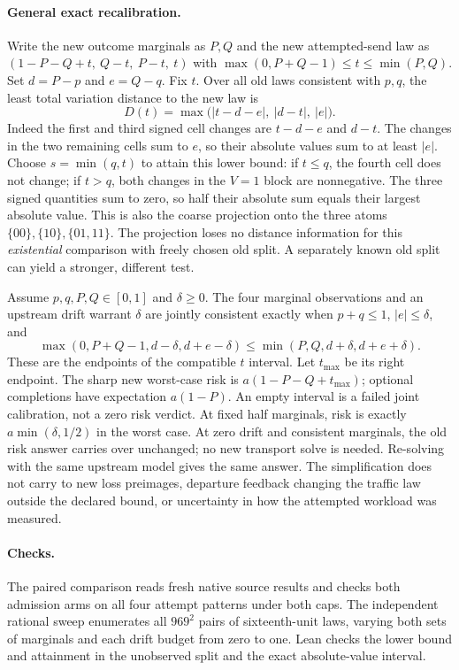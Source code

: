 \documentclass{article}
\begin{document}
\paragraph{General exact recalibration.}
Write the new outcome marginals as $P,Q$ and the new attempted-send law as
$(1-P-Q+t,\ Q-t,\ P-t,\ t)$ with
$\max(0,P+Q-1)\le t\le\min(P,Q)$. Set $d=P-p$ and $e=Q-q$.
Fix $t$. Over all old laws consistent with $p,q$, the least total
variation distance to the new law is
\[
  D(t)=\max\bigl(|t-d-e|,\ |d-t|,\ |e|\bigr).
\]
Indeed the first and third signed cell changes are $t-d-e$ and $d-t$.
The changes in the two remaining cells sum to $e$, so their absolute
values sum to at least $|e|$. Choose $s=\min(q,t)$ to attain this lower
bound: if $t\le q$, the fourth cell does not change; if $t>q$, both
changes in the $V=1$ block are nonnegative. The three signed quantities
sum to zero, so half their absolute sum equals their largest absolute
value. This is also the coarse projection onto the three atoms
$\{00\},\{10\},\{01,11\}$. The projection loses no distance information
for this \emph{existential} comparison with freely chosen old split.
A separately known old split can yield a stronger, different test.

Assume $p,q,P,Q\in[0,1]$ and $\delta\ge0$.
The four marginal observations and an upstream drift warrant $\delta$
are jointly consistent exactly when $p+q\le1$, $|e|\le\delta$, and
\[
 \max(0,P+Q-1,d-\delta,d+e-\delta)
 \le
 \min(P,Q,d+\delta,d+e+\delta).
\]
These are the endpoints of the compatible $t$ interval.
Let $t_{\max}$ be its right endpoint. The sharp new worst-case risk
is $a(1-P-Q+t_{\max})$; optional completions have expectation
$a(1-P)$. An empty interval is a failed joint calibration, not a zero
risk verdict. At fixed half marginals, risk is exactly
$a\min(\delta,1/2)$ in the worst case. At zero drift and consistent
marginals, the old risk answer carries over unchanged; no new
transport solve is needed. Re-solving with the same upstream model
gives the same answer. The simplification does not carry to new
loss preimages, departure feedback changing the traffic law outside
the declared bound, or uncertainty in how the attempted workload was
measured.

\paragraph{Checks.}
The paired comparison reads fresh native source results and checks both
admission arms on all four attempt patterns under both caps.
The independent rational sweep enumerates all $969^2$ pairs of
sixteenth-unit laws, varying both sets of marginals and each drift
budget from zero to one. Lean checks the lower bound and attainment in
the unobserved split and the exact absolute-value interval.
\end{document}
